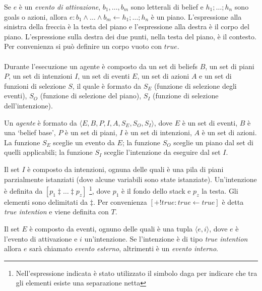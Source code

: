 \smallskip
\begin{defn}
Se $e$ è un \textit{evento di attivazione}, $b_1, \ldots, b_m$ sono letterali di belief e $h_1; \ldots; h_n$ sono goals o azioni, allora $e : b_1 \land \ldots \land b_m \leftarrow h_1; \ldots; h_n$ è un piano. L'espressione alla sinistra della freccia è la testa del piano e l'espressione alla destra è il corpo del piano. L'espressione sulla destra dei due punti, nella testa del piano, è il contesto. Per convenienza si può definire un corpo vuoto con $true$.
\end{defn}

\paragraph*{}
Durante l'esecuzione un agente è composto da un set di beliefs $B$, un set di piani $P$, un set di intenzioni $I$, un set di eventi $E$, un set di azioni $A$ e un set di funzioni di selezione $S$, il quale è formato da $S_E$ (funzione di selezione degli eventi), $S_O$ (funzione di selezione del piano), $S_I$ (funzione di selezione dell'intenzione).

\smallskip
\begin{defn}
Un \textit{agente} è formato da $\langle E,B,P,I,A,S_E,S_O,S_I \rangle$, dove $E$ è un set di eventi, $B$ è una `belief base', $P$ è un set di piani, $I$ è un set di intenzioni, $A$ è un set di azioni. La funzione $S_E$ sceglie un evento da $E$; la funzione $S_O$ sceglie un piano dal set di quelli applicabili; la funzione $S_I$ sceglie l'intenzione da eseguire dal set $I$.
\end{defn}

\smallskip
\begin{defn}
Il set $I$ è composto da intenzioni, ognuna delle quali è una pila di piani parzialmente istanziati (dove alcune variabili sono state istanziate). Un'intenzione è definita da $[p_1 \ddagger \ldots \ddagger p_z]$ \footnote{Nell'espressione indicata è stato utilizzato il simbolo daga per indicare che tra gli elementi esiste una separazione netta}, dove $p_1$ è il fondo dello stack e $p_z$ la testa. Gli elementi sono delimitati da $\ddagger$. Per convenienza $[+!true : true \leftarrow true]$ è detta \textit{true intention} e viene definita con $T$.
\end{defn}

\smallskip
\begin{defn}
Il set $E$ è composto da eventi, ognuno delle quali è una tupla $\langle e, i \rangle$, dove $e$ è l'evento di attivazione e $i$ un'intenzione. Se l'intenzione è di tipo \textit{true intention} allora $e$ sarà chiamato \textit{evento esterno}, altrimenti è un \textit{evento interno}.
\end{defn}

